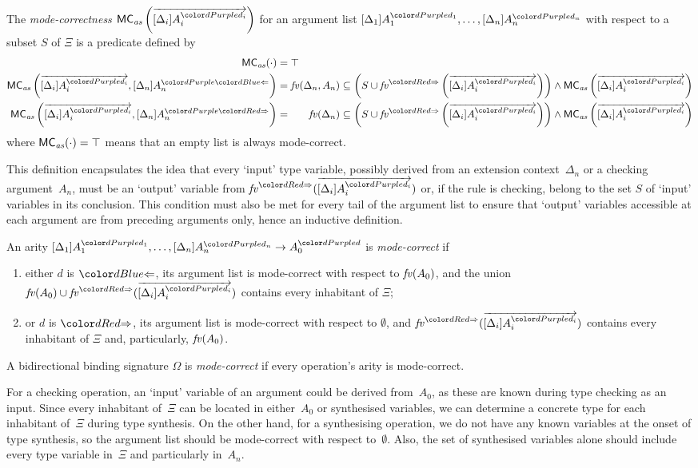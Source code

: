 \begin{defn}\label{def:mode-correctness-args}
  The \emph{mode-correctness} $\MCas\left(\biargvec\right)$ for an argument list $\biargs$ with respect to a subset $S$ of $\Xi$ is a predicate defined by
  {\small
  \begin{align*}
    \MCas( \cdot ) & = \top \\
    \MCas\left(\biargvec, \chkbiarg[n]\right)
                                  & = \fv(\Delta_n, A_n) \subseteq \left( S \cup \synvar\left(\biargvec\right)\right) \land \MCas\left(\biargvec\right) \\
    \label{eq:MC2} \MCas\left(\biargvec, \synbiarg[n]\right) 
                                  & = \phantom{, A_n} \fv(\Delta_n) \subseteq \left( S \cup \synvar\left(\biargvec\right)\right) \land  \MCas\left(\biargvec\right)
  \end{align*}}
  where $\mathsf{MC}_{\mathit{as}}( \cdot ) = \top$ means that an empty list is always mode-correct.
\end{defn}
This definition encapsulates the idea that every `input' type variable, possibly derived from an extension context~$\Delta_n$ or a checking argument~$A_n$, must be an `output' variable from $\synvar(\biargvec)$ or, if the rule is checking, belong to the set $S$ of `input' variables in its conclusion.
This condition must also be met for every tail of the argument list to ensure that `output' variables accessible at each argument are from preceding arguments only, hence an inductive definition.
\begin{defn}\label{def:mode-correctness}
  An arity $\biarity$ is \emph{mode-correct} if 
  \begin{enumerate}
    \item either $d$ is $\chk$, its argument list is mode-correct with respect to $\mathit{fv}(A_0)$, and the union $\fv(A_0) \cup \synvar(\biargvec)$ contains every inhabitant of $\Xi$;
    \item or $d$ is $\syn$, its argument list is mode-correct with respect to $\emptyset$, and $\synvar(\biargvec)$ contains every inhabitant of $\Xi$ and, particularly, $\mathit{fv}(A_0)$.
  \end{enumerate}
  A bidirectional binding signature $\Omega$ is \emph{mode-correct} if every operation's arity is mode-correct.
\end{defn}
For a checking operation, an `input' variable of an argument could be derived from~$A_0$, as these are known during type checking as an input.
Since every inhabitant of~$\Xi$ can be located in either~$A_0$ or synthesised variables, we can determine a concrete type for each inhabitant of~$\Xi$ during type synthesis.
On the other hand, for a synthesising operation, we do not have any known variables at the onset of type synthesis, so the argument list should be mode-correct with respect to~$\emptyset$.
Also, the set of synthesised variables alone should include every type variable in~$\Xi$ and particularly in~$A_n$.

